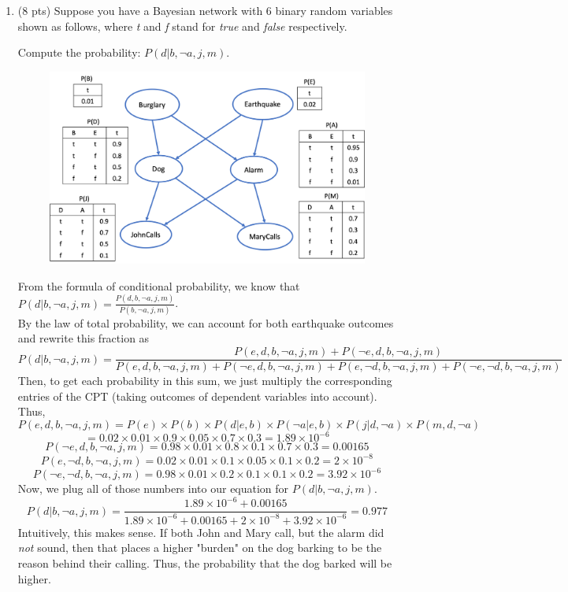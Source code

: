 \documentclass{article}
\newenvironment{soln}{
	\leavevmode\color{blue}\ignorespaces
}{}
\begin{document}
\begin{enumerate}
\item (8 pts) Suppose you have a Bayesian network with 6 binary random variables shown as follows, where \emph{t} and \emph{f} stand for \emph{true} and \emph{false} respectively.

Compute the probability: $P(d | b, \neg a, j, m)$.

\begin{figure}[h]
\centering
\includegraphics[scale=0.5]{figs/p1}
\label{fig:q1}
\end{figure}

\begin{soln}
From the formula of conditional probability, we know that $P(d | b, \neg a, j, m) = \frac{P(d, b, \neg a, j, m)}{P(b, \neg a, j, m)}$. \\ By the law of total probability, we can account for both earthquake outcomes and rewrite this fraction as  
\[ P(d | b, \neg a, j, m) = \frac{P(e,d, b, \neg a, j, m) + P(\neg e, d, b, \neg a, j, m)}{P(e, d, b, \neg a, j, m) + P(\neg e, d, b, \neg a, j, m) + P(e, \neg d, b, \neg a, j, m) + P(\neg e, \neg d, b, \neg a, j, m)} \]
Then, to get each probability in this sum, we just multiply the corresponding entries of the CPT (taking outcomes of dependent variables into account). Thus,
\[ P(e,d, b, \neg a, j, m) = P(e) \times P(b) \times P(d | e, b) \times P(\neg a | e, b) \times P(j | d, \neg a) \times P(m, d, \neg a) \]
\[ = 0.02 \times 0.01 \times 0.9 \times 0.05 \times 0.7 \times 0.3 = 1.89\times10^{-6}\] 
\[P(\neg e, d, b, \neg a, j, m) = 0.98 \times 0.01 \times 0.8 \times 0.1 \times 0.7 \times 0.3 = 0.00165\]
\[P(e, \neg d, b, \neg a, j, m) = 0.02 \times 0.01 \times 0.1 \times 0.05 \times 0.1 \times 0.2 = 2\times 10^{-8}\]
\[P(\neg e, \neg d, b, \neg a, j, m) = 0.98 \times 0.01 \times 0.2 \times 0.1 \times 0.1 \times 0.2 = 3.92\times 10^{-6}\]
Now, we plug all of those numbers into our equation for $P(d | b, \neg a, j, m)$.
\[P(d | b, \neg a, j, m) = \frac{1.89\times10^{-6} + 0.00165}{1.89\times10^{-6} + 0.00165 + 2\times 10^{-8} +  3.92\times 10^{-6}} = 0.977\]
Intuitively, this makes sense. If both John and Mary call, but the alarm did \textit{not} sound, then that places a higher "burden" on the dog barking to be the reason behind their calling. Thus, the probability that the dog barked will be higher.
\end{soln}


\end{enumerate}
\end{document}
